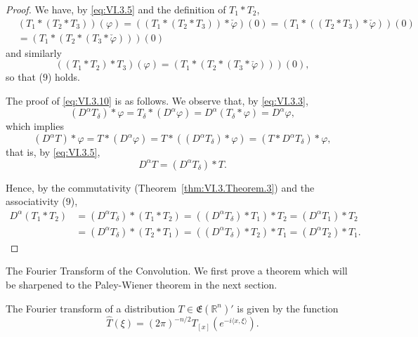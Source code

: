 \begin{proof}
 We have, by \eqref{eq:VI.3.5} and the definition of $T_{1} * T_{2}$, 
\[
\begin{aligned}
&(T _{1} * (T _{2} * T _{3})) (\varphi)  = \left((T _{1} * (T _{2} * T _{3})) * \check {\varphi}\right) (0) = (T _{1} * ((T _{2} * T _{3}) * \check {\varphi})) (0) \\
&= (T _{1} * (T _{2} * (T _{3} * \check {\varphi}))) (0)
\end{aligned}
\]
and similarly 
\[
\left(\left(T _{1} * T _{2}\right) * T _{3}\right) (\varphi) = \left(T _{1} * \left(T _{2} * \left(T _{3} * \check {\varphi}\right)\right)\right) (0),
\]
so that ($9$) holds. 

The proof of \eqref{eq:VI.3.10} is as follows. We observe that, by \eqref{eq:VI.3.3}, 
\begin{equation}\label{eq:VI.3.11}
(D ^{\alpha} T _{\delta}) * \varphi = T _{\delta} * (D ^{\alpha} \varphi) = D ^{\alpha} (T _{\delta} * \varphi) = D ^{\alpha} \varphi ,
\end{equation}
which implies 
\[
(D ^{\alpha} T) * \varphi = T * (D ^{\alpha} \varphi) = T * ((D ^{\alpha} T _{\delta}) * \varphi) = (T * D ^{\alpha} T _{\delta}) * \varphi ,
\]
that is, by \eqref{eq:VI.3.5}, 
\begin{equation}\label{eq:VI.3.12}
D ^{\alpha} T = (D ^{\alpha} T _{\delta}) * T.
\end{equation}

Hence, by the commutativity (Theorem~\ref{thm:VI.3.Theorem.3}) and the associativity ($9$), 
\[
\begin{aligned} D ^{\alpha} (T _{1} \ast T _{2}) & = (D ^{\alpha} T _{\delta}) \ast (T _{1} \ast T _{2}) = ((D ^{\alpha} T _{\delta}) \ast T _{1}) \ast T _{2} = (D ^{\alpha} T _{1}) \ast T _{2} \\ & = (D ^{\alpha} T _{\delta}) \ast (T _{2} \ast T _{1}) = ((D ^{\alpha} T _{\delta}) \ast T _{2}) \ast T _{1} = (D ^{\alpha} T _{2}) \ast T _{1}. \end{aligned}
\]
\end{proof}

The Fourier Transform of the Convolution. We first prove a theorem which will be sharpened to the Paley-Wiener theorem in the next section. 

\begin{theorem}\label{thm:VI.3.Theorem.4} The Fourier transform of a distribution $T \in \mathfrak{E}(\mathbb{R}^{n})'$ is given by the function 
\begin{equation}\label{eq:VI.3.13}
\hat {T} (\xi) = (2 \pi) ^{-n/2} T _{[x]} (e ^{- i \langle x, \xi \rangle}).
\end{equation}
\end{theorem}

